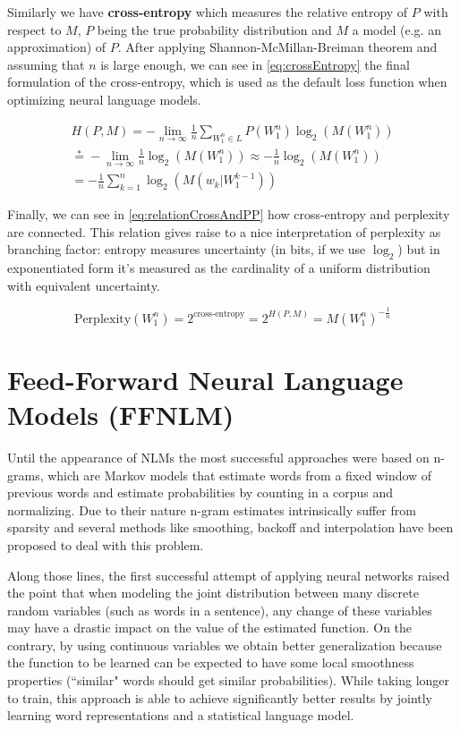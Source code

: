 Similarly we have \textbf{cross-entropy} which measures the relative entropy of $P$ with respect to $M$, $P$ being the true probability distribution and $M$ a model (e.g. an approximation) of $P$. After applying Shannon-McMillan-Breiman theorem and assuming that $n$ is large enough, we can see in \autoref{eq:crossEntropy} the final formulation of the cross-entropy, which is used as the default loss function when optimizing neural language models.

\begin{equation} \label{eq:crossEntropy}
	\begin{gathered}
		H(P,M) = -\lim\limits_{n \rightarrow \infty}\frac{1}{n}\sum_{W_1^n \in L}P(W_1^n)\log_2(M(W_1^n)) \\
		\stackrel{*}{=} -\lim\limits_{n \rightarrow \infty}\frac{1}{n}\log_2(M(W_1^n)) \approx -\frac{1}{n}\log_2(M(W_1^n)) \\
		= -\frac{1}{n}\sum_{k=1}^{n}\log_2(M(w_k|W_{1}^{k-1}))
	\end{gathered}
\end{equation}

Finally, we can see in \autoref{eq:relationCrossAndPP} how cross-entropy and perplexity are connected. This relation gives raise to a nice interpretation of perplexity as branching factor: entropy measures uncertainty (in bits, if we use $\log_2$) but in exponentiated form it's measured as the cardinality of a uniform distribution with equivalent uncertainty.

\begin{equation} \label{eq:relationCrossAndPP}
	\text{Perplexity}(W_1^n) = 2^{\text{cross-entropy}} = 2^{H(P,M)} = M(W_1^n)^{-\frac{1}{n}}
\end{equation}

\section{Feed-Forward Neural Language Models (FFNLM)}
\label{sec:forwardnlm}

Until the appearance of NLMs the most successful approaches were based on n-grams, which are Markov models that estimate words from a fixed window of previous
words and estimate probabilities by counting in a corpus and normalizing. Due to their nature n-gram estimates intrinsically suffer from sparsity and several methods like smoothing, backoff and interpolation have been proposed to deal with this problem.

Along those lines, the first successful attempt of applying neural networks \cite{bengio2003neural} raised the point that when modeling the joint distribution between many discrete random variables (such as words in a sentence), any change of these variables may have a drastic impact on the value of the estimated function. On the contrary, by using continuous variables we obtain better generalization because the function to be learned can be expected to have some local smoothness properties (``similar" words should get similar probabilities). While taking longer to train, this approach is able to achieve significantly better results by jointly learning word representations and a statistical language model.

